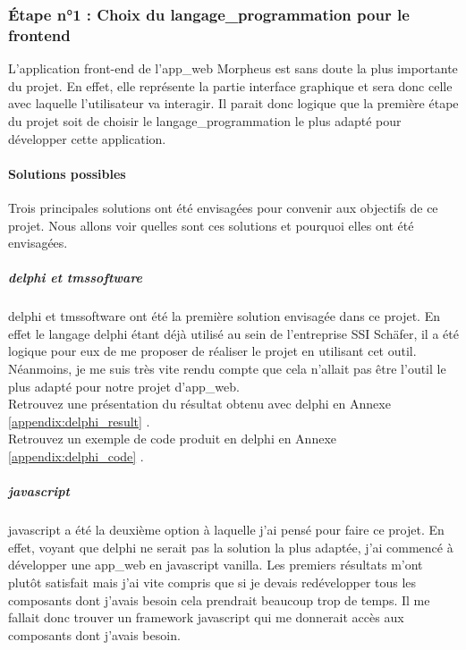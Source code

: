 \documentclass[a4paper, 12pt, french]{article}
\begin{document}
				\subsubsection{Étape n°1 : Choix du \gls{langage_programmation} pour le \gls{frontend}}
					L'application front-end de l'\gls{app_web} Morpheus est sans doute la plus importante du projet. En effet, elle représente la partie interface graphique et sera donc celle avec laquelle l'utilisateur va interagir. Il parait donc logique que la première étape du projet soit de choisir le \gls{langage_programmation} le plus adapté pour développer cette application.
	
					\paragraph{Solutions possibles\\}
						Trois principales solutions ont été envisagées pour convenir aux objectifs de ce projet. Nous allons voir quelles sont ces solutions et pourquoi elles ont été envisagées.
						
						\subparagraph{\gls{delphi} et \gls{tmssoftware}\\}
							\gls{delphi} et \gls{tmssoftware} ont été la première solution envisagée dans ce projet. En effet le langage \gls{delphi}
							 étant déjà utilisé au sein de l'entreprise SSI Schäfer, il a été logique pour eux de me proposer de réaliser le projet en utilisant cet outil. Néanmoins, je me suis très vite rendu compte que cela n'allait pas être l'outil le plus adapté pour notre projet d'\gls{app_web}.\\

								\noindent Retrouvez une présentation du résultat obtenu avec \gls{delphi} en Annexe \ref{appendix:delphi_result} .\\
								\noindent Retrouvez un exemple de code produit en \gls{delphi} en Annexe \ref{appendix:delphi_code} .
											
						\subparagraph{\gls{javascript}\\}
							\gls{javascript} a été la deuxième option à laquelle j'ai pensé pour faire ce projet. En effet, voyant que \gls{delphi} ne serait pas la solution la plus adaptée, j'ai commencé à développer une \gls{app_web} en \gls{javascript} vanilla. Les premiers résultats m'ont plutôt satisfait mais j'ai vite compris que si je devais redévelopper tous les composants dont j'avais besoin cela prendrait beaucoup trop de temps. Il me fallait donc trouver un \gls{framework} \gls{javascript} qui me donnerait accès aux composants dont j'avais besoin.
					
\end{document}
